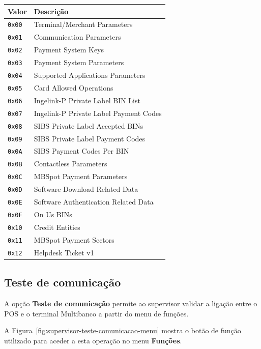 \documentclass[a4paper,12pt]{article}
\begin{document}
\begin{longtable}{|p{2.2cm}|p{9.8cm}|}
\hline
\textbf{Valor} & \textbf{Descrição} \\
\hline
\texttt{0x00} & Terminal/Merchant Parameters \\
\hline
\texttt{0x01} & Communication Parameters \\
\hline
\texttt{0x02} & Payment System Keys \\
\hline
\texttt{0x03} & Payment System Parameters \\
\hline
\texttt{0x04} & Supported Applications Parameters \\
\hline
\texttt{0x05} & Card Allowed Operations \\
\hline
\texttt{0x06} & Ingelink-P Private Label BIN List \\
\hline
\texttt{0x07} & Ingelink-P Private Label Payment Codes \\
\hline
\texttt{0x08} & SIBS Private Label Accepted BINs \\
\hline
\texttt{0x09} & SIBS Private Label Payment Codes \\
\hline
\texttt{0x0A} & SIBS Payment Codes Per BIN \\
\hline
\texttt{0x0B} & Contactless Parameters \\
\hline
\texttt{0x0C} & MBSpot Payment Parameters \\
\hline
\texttt{0x0D} & Software Download Related Data \\
\hline
\texttt{0x0E} & Software Authentication Related Data \\
\hline
\texttt{0x0F} & On Us BINs \\
\hline
\texttt{0x10} & Credit Entities \\
\hline
\texttt{0x11} & MBSpot Payment Sectors \\
\hline
\texttt{0x12} & Helpdesk Ticket v1 \\
\hline
\end{longtable}

\subsection{Teste de comunicação}

A opção \textbf{Teste de comunicação} permite ao supervisor validar a
ligação entre o POS e o terminal Multibanco a partir do menu de funções.

A Figura~\ref{fig:supervisor-teste-comunicacao-menu} mostra o botão de função
utilizado para aceder a esta operação no menu \textbf{Funções}.
\end{document}
